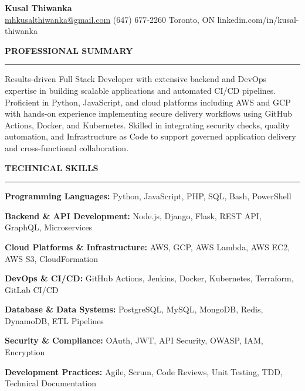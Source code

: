 \documentclass[10pt,letterpaper]{article}
\begin{document}
\begin{center}
{\LARGE\textbf{Kusal Thiwanka}}\\[3pt]
\href{mailto:mhkusalthiwanka@gmail.com}{mhkusalthiwanka@gmail.com}\hspace{2em}%
(647) 677{-}2260\hspace{2em}%
Toronto, ON\hspace{2em}
linkedin.com/in/kusal-thiwanka
\end{center}

\vspace{6pt}

\textbf{PROFESSIONAL SUMMARY}\\[-8pt]
\noindent\rule{\textwidth}{1pt}

\vspace{-2pt}

Results-driven Full Stack Developer with extensive backend and DevOps expertise in building scalable applications and automated CI/CD pipelines. Proficient in Python, JavaScript, and cloud platforms including AWS and GCP with hands-on experience implementing secure delivery workflows using GitHub Actions, Docker, and Kubernetes. Skilled in integrating security checks, quality automation, and Infrastructure as Code to support governed application delivery and cross-functional collaboration.

\vspace{8pt}

\textbf{TECHNICAL SKILLS}\\[-8pt]
\noindent\rule{\textwidth}{1pt}

\vspace{-2pt}

\textbf{Programming Languages:} Python, JavaScript, PHP, SQL, Bash, PowerShell

\textbf{Backend \& API Development:} Node.js, Django, Flask, REST API, GraphQL, Microservices

\textbf{Cloud Platforms \& Infrastructure:} AWS, GCP, AWS Lambda, AWS EC2, AWS S3, CloudFormation

\textbf{DevOps \& CI/CD:} GitHub Actions, Jenkins, Docker, Kubernetes, Terraform, GitLab CI/CD

\textbf{Database \& Data Systems:} PostgreSQL, MySQL, MongoDB, Redis, DynamoDB, ETL Pipelines

\textbf{Security \& Compliance:} OAuth, JWT, API Security, OWASP, IAM, Encryption

\textbf{Development Practices:} Agile, Scrum, Code Reviews, Unit Testing, TDD, Technical Documentation
\end{document}
